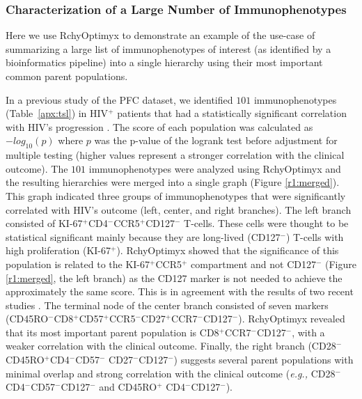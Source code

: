 \subsubsection{Characterization of a Large Number of Immunophenotypes}
Here we use RchyOptimyx to demonstrate an example of the use-case of summarizing a large list of immunophenotypes of interest (as identified by a bioinformatics pipeline) into a single hierarchy using their most important common parent populations.

In a previous study of the PFC dataset, we identified $101$ immunophenotypes (Table~\ref{apx:tsl}) in HIV$^+$ patients that had a statistically significant correlation with HIV's progression \cite{Aghaeepour2012}.
The score of each population was calculated as $-log_{10}(p)$ where $p$ was the p-value of the logrank test before adjustment for multiple testing (higher values represent a stronger correlation with the clinical outcome).
The $101$ immunophenotypes were analyzed using RchyOptimyx and the resulting hierarchies were merged into a single graph (Figure \ref{r1:merged}).
This graph indicated  three groups of immunophenotypes that were significantly correlated with HIV's outcome (left, center, and right branches).
The left branch consisted of KI-67$^+$CD4$^-$CCR5$^+$CD127$^-$ T-cells.
These cells were thought to be statistical significant mainly because they are long-lived (CD127$^-$) T-cells with high proliferation (KI-67$^+$). 
RchyOptimyx showed that the significance of this population is related to the KI-67$^+$CCR5$^+$ compartment and not CD127$^-$ (Figure \ref{r1:merged}, the left branch) as the CD127 marker is not needed to achieve the approximately the same score.  
This is in agreement with the results of two recent studies \cite{gordon2010disruption,jaspan2011immune}.
The terminal node of the center branch consisted of seven markers (CD45RO$^-$CD8$^+$CD57$^+$CCR5$^-$CD27$^+$CCR7$^-$CD127$^-$). 
RchyOptimyx revealed that its most important parent population is CD8$^+$CCR7$^-$CD127$^-$, with a weaker correlation with the clinical outcome.
Finally, the right branch (CD28$^-$CD45RO$^+$CD4$^-$CD57$^-$ CD27$^-$CD127$^-$) suggests several parent populations with minimal overlap and strong correlation with the clinical outcome (\emph{e.g.,} CD28$^-$CD4$^-$CD57$^-$CD127$^-$ and CD45RO$^+$ CD4$^-$CD127$^-$). 

